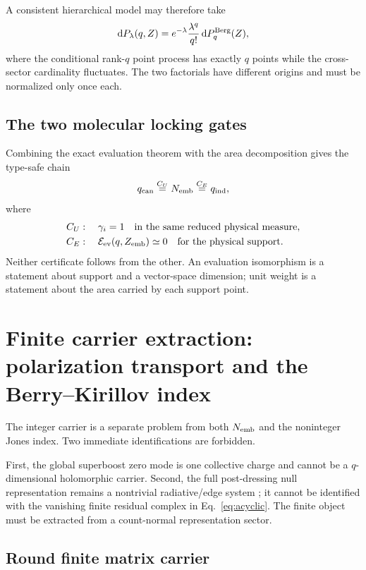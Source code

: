 \documentclass[aps,prd,preprint,nofootinbib,superscriptaddress]{revtex4-2}
\theoremstyle{definition}
\theoremstyle{remark}
\newcommand{\cE}{\mathcal E}
\newcommand{\dd}{\mathrm d}
\begin{document}
A consistent hierarchical model may therefore take
\begin{equation}
\dd P_\lambda(q,Z)
=
e^{-\lambda}
\frac{\lambda^q}{q!}
\,\dd P_q^{\rm Berg}(Z),
\label{eq:hierarchicalDPP}
\end{equation}
where the conditional rank-$q$ point process has exactly $q$ points while the cross-sector cardinality fluctuates.  The two factorials have different origins and must be normalized only once each.

\subsection{The two molecular locking gates}

Combining the exact evaluation theorem with the area decomposition gives the type-safe chain
\begin{equation}
q_{\rm can}
\overset{C_U}{=}
N_{\rm emb}
\overset{C_E}{=}
q_{\rm ind},
\label{eq:triplelock}
\end{equation}
where
\begin{align}
C_U&:\quad \gamma_i=1
\quad\text{in the same reduced physical measure},
\label{eq:CU}
\\
C_E&:\quad \cE_{\rm ev}(q,Z_{\rm emb})\simeq0
\quad\text{for the physical support}.
\end{align}
Neither certificate follows from the other.  An evaluation isomorphism is a statement about support and a vector-space dimension; unit weight is a statement about the area carried by each support point.

\section{Finite carrier extraction: polarization transport and the Berry--Kirillov index}
\label{sec:carrier}

The integer carrier is a separate problem from both $N_{\rm emb}$ and the noninteger Jones index.  Two immediate identifications are forbidden.

First, the global superboost zero mode is one collective charge and cannot be a $q$-dimensional holomorphic carrier.  Second, the full post-dressing null representation remains a nontrivial radiative/edge system \cite{FreidelKirklin2026}; it cannot be identified with the vanishing finite residual complex in Eq.~\eqref{eq:acyclic}.  The finite object must be extracted from a count-normal representation sector.

\subsection{Round finite matrix carrier}
\end{document}
